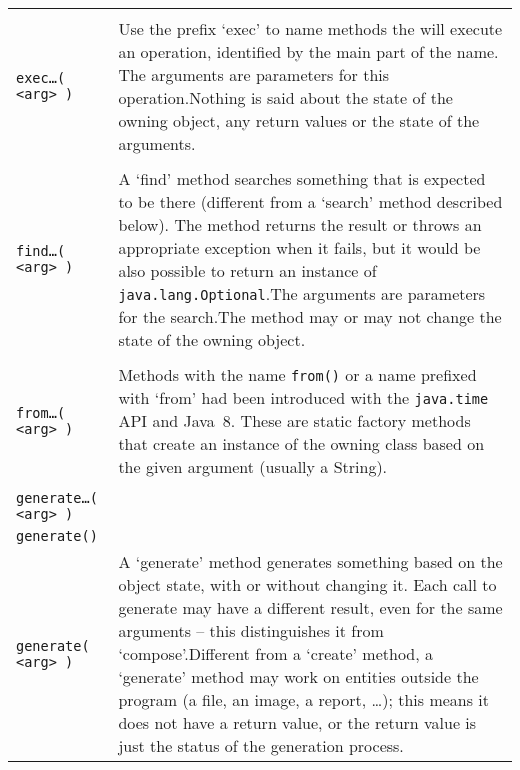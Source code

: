 \begin{longtable}{|l|X|}
    \makecell{\lstinline|exec…()| \\ \lstinline|exec…( <arg> )|} & Use the prefix ‘exec’ to name methods the will execute an operation, identified by the main part of the name. The arguments are parameters for this operation.\newline Nothing is said about the state of the owning object, any return values or the state of the arguments. \\
    \hline

    \makecell{\lstinline|find( <arg> )| \\ \lstinline|find…( <arg> )|} & A ‘find’ method searches something that is expected to be there (different from a ‘search’ method described below). The method returns the result or throws an appropriate exception when it fails, but it would be also possible to return an instance of \lstinline|java.lang.Optional|.\newline The arguments are parameters for the search.\newline The method may or may not change the state of the owning object. \\
    \hline

    \makecell{\lstinline|from( <arg> )| \\ \lstinline|from…( <arg> )|} & Methods with the name \lstinline|from()| or a name prefixed with ‘from’ had been introduced with the \lstinline|java.time| API and Java~8. These are static factory methods that create an instance of the owning class based on the given argument (usually a String). \\
    \hline

    \makecell{\lstinline|generate…()| \\ \lstinline|generate…( <arg> )| \\ \lstinline|generate()| \\ \lstinline|generate( <arg> )|} & A ‘generate’ method generates something based on the object state, with or without changing it. Each call to generate may have a different result, even for the same arguments – this distinguishes it from ‘compose’.\newline Different from a ‘create’ method, a ‘generate’ method may work on entities outside the program (a file, an image, a report, …); this means it does not have a return value, or the return value is just the status of the generation process. \\
    \hline


\end{longtable}
